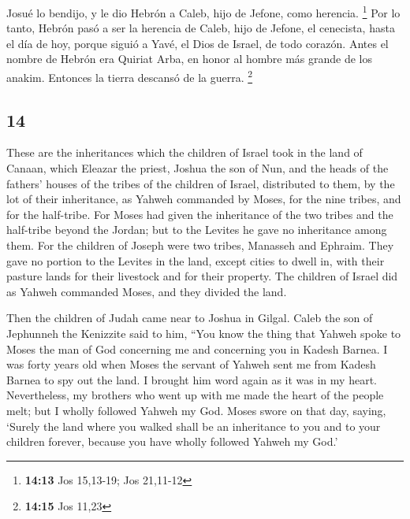 \begin{paracol}{2}
 Josué lo bendijo, y le dio Hebrón a Caleb, hijo de
Jefone, como herencia. \footnote{\textbf{14:13} Jos 15,13-19; Jos
  21,11-12}  Por lo tanto, Hebrón pasó a ser la herencia
de Caleb, hijo de Jefone, el cenecista, hasta el día de hoy, porque
siguió a Yavé, el Dios de Israel, de todo corazón.  Antes
el nombre de Hebrón era Quiriat Arba, en honor al hombre más grande de
los anakim. Entonces la tierra descansó de la guerra. \footnote{\textbf{14:15}
  Jos 11,23}

\switchcolumn
\begin{otherlanguage}{english}

\hypertarget{section-27}{%
\section{14}\label{section-27}}

 These are the inheritances which the children of Israel
took in the land of Canaan, which Eleazar the priest, Joshua the son of
Nun, and the heads of the fathers' houses of the tribes of the children
of Israel, distributed to them,  by the lot of their
inheritance, as Yahweh commanded by Moses, for the nine tribes, and for
the half-tribe.  For Moses had given the inheritance of
the two tribes and the half-tribe beyond the Jordan; but to the Levites
he gave no inheritance among them.  For the children of
Joseph were two tribes, Manasseh and Ephraim. They gave no portion to
the Levites in the land, except cities to dwell in, with their pasture
lands for their livestock and for their property.  The
children of Israel did as Yahweh commanded Moses, and they divided the
land.

 Then the children of Judah came near to Joshua in Gilgal.
Caleb the son of Jephunneh the Kenizzite said to him, ``You know the
thing that Yahweh spoke to Moses the man of God concerning me and
concerning you in Kadesh Barnea.  I was forty years old
when Moses the servant of Yahweh sent me from Kadesh Barnea to spy out
the land. I brought him word again as it was in my heart. 
Nevertheless, my brothers who went up with me made the heart of the
people melt; but I wholly followed Yahweh my God.  Moses
swore on that day, saying, `Surely the land where you walked shall be an
inheritance to you and to your children forever, because you have wholly
followed Yahweh my God.'


\end{otherlanguage}
\end{paracol}
